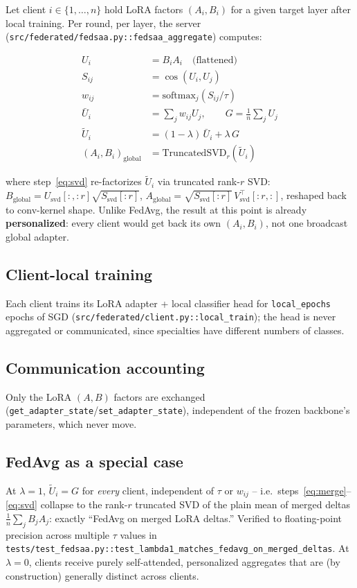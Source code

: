 \documentclass[11pt]{article}
\begin{document}
Let client $i \in \{1,\dots,n\}$ hold LoRA factors $(A_i, B_i)$ for a given target layer after
local training. Per round, per layer, the server
(\texttt{src/federated/fedsaa.py::fedsaa\_aggregate}) computes:

\begin{align}
  U_i &= B_i A_i \quad \text{(flattened)} \label{eq:merge} \\
  S_{ij} &= \cos(U_i, U_j) \label{eq:sim} \\
  w_{ij} &= \mathrm{softmax}_j\!\left(S_{ij} / \tau\right) \label{eq:attn} \\
  \bar{U}_i &= \sum_j w_{ij} U_j, \qquad G = \frac{1}{n}\sum_j U_j \label{eq:agg} \\
  \tilde{U}_i &= (1-\lambda)\,\bar{U}_i + \lambda\, G \label{eq:blend} \\
  (A_i, B_i)_{\text{global}} &= \mathrm{TruncatedSVD}_r(\tilde{U}_i) \label{eq:svd}
\end{align}

where step~\eqref{eq:svd} re-factorizes $\tilde{U}_i$ via truncated rank-$r$ SVD:
$B_{\text{global}} = U_{\text{svd}}[:,{:}r]\sqrt{S_{\text{svd}}[{:}r]}$,
$A_{\text{global}} = \sqrt{S_{\text{svd}}[{:}r]}\,V_{\text{svd}}^\top[{:}r,:]$, reshaped back to
conv-kernel shape. Unlike FedAvg, the result at this point is already \textbf{personalized}:
every client would get back its own $(A_i,B_i)$, not one broadcast global adapter.

\subsection{Client-local training}
Each client trains its LoRA adapter + local classifier head for \texttt{local\_epochs} epochs of
SGD (\texttt{src/federated/client.py::local\_train}); the head is never aggregated or
communicated, since specialties have different numbers of classes.

\subsection{Communication accounting}
Only the LoRA $(A,B)$ factors are exchanged
(\texttt{get\_adapter\_state}/\texttt{set\_adapter\_state}), independent of the frozen backbone's
parameters, which never move.

\subsection{FedAvg as a special case}
\label{sec:method-fedavg-equiv}
At $\lambda=1$, $\tilde{U}_i = G$ for \emph{every} client, independent of $\tau$ or $w_{ij}$ --
i.e.\ steps~\eqref{eq:merge}--\eqref{eq:svd} collapse to the rank-$r$ truncated SVD of the plain
mean of merged deltas $\frac{1}{n}\sum_j B_jA_j$: exactly ``FedAvg on merged LoRA deltas.''
Verified to floating-point precision across multiple $\tau$ values in
\texttt{tests/test\_fedsaa.py::test\_lambda1\_matches\_fedavg\_on\_merged\_deltas}. At
$\lambda=0$, clients receive purely self-attended, personalized aggregates that are (by
construction) generally distinct across clients.
\end{document}
